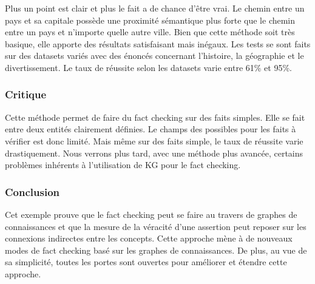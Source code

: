 Plus un point est clair et plus le fait a de chance d'être vrai. Le chemin entre un pays et sa capitale possède une proximité sémantique plus forte que le chemin entre un pays et n'importe quelle autre ville. Bien que cette méthode soit très basique, elle apporte des résultats satisfaisant mais inégaux. Les tests se sont faits sur des datasets variés avec des énoncés concernant l'histoire, la géographie et le divertissement. Le taux de réussite selon les datasets varie entre 61\% et 95\%. 

\subsubsection{Critique} Cette méthode permet de faire du fact checking sur des faits simples. Elle se fait entre deux entités clairement définies. Le champs des possibles pour les faits à vérifier est donc limité. Mais même sur des faits simple, le taux de réussite varie drastiquement.
Nous verrons plus tard, avec une méthode plus avancée, certains problèmes inhérents à l'utilisation de KG pour le fact checking.

\subsubsection{Conclusion}

Cet exemple prouve que le fact checking peut se faire au travers de graphes de connaissances et que la mesure de la véracité d'une assertion peut reposer sur les connexions indirectes entre les concepts. Cette approche mène à de nouveaux modes de fact checking basé sur les graphes de connaissances. De plus, au vue de sa simplicité, toutes les portes sont ouvertes pour améliorer et étendre cette approche.